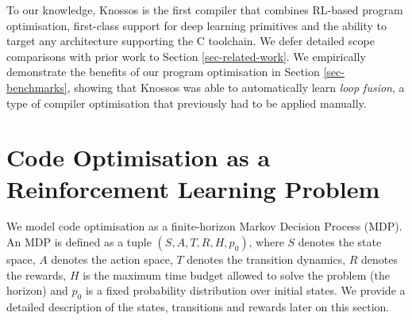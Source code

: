 \documentclass[fullpage,twocolumn]{article} %
\def\Cpp{{C\nolinebreak[4]\hspace{-.05em}\raisebox{.4ex}{\tiny\bf ++}} }
\begin{document}
To our knowledge, Knossos is the first compiler that combines RL-based program optimisation, first-class support for deep learning primitives and the ability to target any architecture supporting the \Cpp toolchain. We defer detailed scope comparisons with prior work to Section \ref{sec-related-work}. We empirically demonstrate the benefits of our program optimisation in Section \ref{sec-benchmarks}, showing that Knossos was able to automatically learn \emph{loop fusion}, a type of compiler optimisation that previously had to be applied manually.

\section{Code Optimisation as a Reinforcement Learning Problem}
\label{sec-mdp-def}
We model code optimisation as a finite-horizon Markov Decision Process (MDP). An MDP is defined \citep{Puterman2014, suttonReinforcementLearningIntroduction2018} as a tuple $(S, A, T, R, H, p_0)$, where $S$ denotes the state space, $A$ denotes the action space, $T$ denotes the transition dynamics, $R$ denotes the rewards, $H$ is the maximum time budget allowed to solve the problem (the horizon) and $p_0$ is a fixed probability distribution over initial states. We provide a detailed description of the states, transitions and rewards later on this section.
\end{document}
